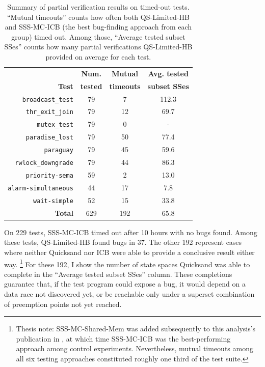 \begin{table}[h]
	\begin{center}
	\small
	\begin{tabular}{r|c||c|c}
		& {\bf Num.} & {\bf Mutual} & {\bf Avg. tested} \\
		{\bf Test} & {\bf tested} & {\bf timeouts} & {\bf subset SSes} \\
		\hline
		{\tt broadcast\_test}    & 79  & 7    & 112.3 \\
		{\tt thr\_exit\_join}    & 79  & {12} & {69.7} \\
		{\tt mutex\_test}        & 79  & 0    & -     \\
		{\tt paradise\_lost}     & 79  & {50} & {77.4} \\
		{\tt paraguay}           & 79  & 45   & {59.6} \\
		{\tt rwlock\_downgrade}  & 79  & {44} & {86.3} \\
		\hline
		{\tt priority-sema}      & 59  & 2    & 13.0  \\
		{\tt alarm-simultaneous} & 44  & {17} & {7.8}  \\
		{\tt wait-simple}        & 52  & {15} & {33.8} \\
		\hline
		{\bf Total}              & 629 & {192}& {65.8} \\
	\end{tabular}
	\end{center}
	\caption[Summary of partial verification results on timed-out tests.]
	{Summary of partial verification results on timed-out tests.
	``Mutual timeouts'' counts how often both QS-Limited-HB and SSS-MC-ICB
	(the best bug-finding approach from each group)
	timed out. %
	Among those, ``Average tested subset SSes'' counts how many partial verifications
	QS-Limited-HB provided on average for each test. %
	}
	\label{tab:partialverifs}
\end{table}

On 229 tests, SSS-MC-ICB timed out after 10 hours with no bugs found. %
Among these tests, QS-Limited-HB %
found bugs in 37.
The other 192 represent cases where neither Quicksand nor ICB were able to provide a conclusive result either way.%
\footnote{Thesis note: SSS-MC-Shared-Mem was added
subsequently to this analysis's publication in \cite{quicksand},
at which time SSS-MC-ICB was the best-performing approach among control experiments.
Nevertheless, mutual timeouts among all six testing approaches constituted roughly one third of the test suite.}
For these 192,
I show the number of state spaces Quicksand was able to complete in the
``Average tested subset SSes'' column.
These completions guarantee that, if the test program could expose a bug,
it would depend on a data race not discovered yet,
or be reachable only under a superset combination of preemption points not yet reached.

